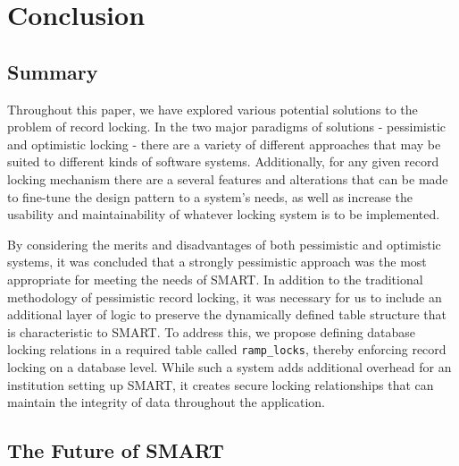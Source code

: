 \documentclass[12pt]{article}
\newcommand{\code}[1]{\texttt{#1}}
\begin{document}
\newpage
\section{Conclusion}

\subsection{Summary}
Throughout this paper, we have explored various potential solutions to the problem of record locking. In the two major paradigms of solutions - pessimistic and optimistic locking - there are a variety of different approaches that may be suited to different kinds of software systems. Additionally, for any given record locking mechanism there are a several features and alterations that can be made to fine-tune the design pattern to a system’s needs, as well as increase the usability and maintainability of whatever locking system is to be implemented.

By considering the merits and disadvantages of both pessimistic and optimistic systems, it was concluded that a strongly pessimistic approach was the most appropriate for meeting the needs of SMART. In addition to the traditional methodology of pessimistic record locking, it was necessary for us to include an additional layer of logic to preserve the dynamically defined table structure that is characteristic to SMART. To address this, we propose defining database locking relations in a required table called \code{ramp\_locks}, thereby enforcing record locking on a database level. While such a system adds additional overhead for an institution setting up SMART, it creates secure locking relationships that can maintain the integrity of data throughout the application.

\subsection{The Future of SMART}
\end{document}

